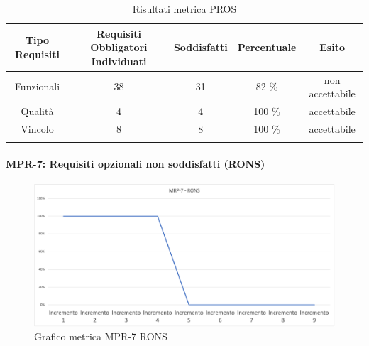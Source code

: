 \begin{center}
    \begin{longtable}{|c|c|c|c|c|}
        \hline
        \rowcolor{lighter-grayer}
        \textbf {Tipo Requisiti} & \textbf{Requisiti Obbligatori Individuati} & \textbf{Soddisfatti} & \textbf{Percentuale} & \textbf{Esito} \\
        \hline
        \endfirsthead

        \hline
        Funzionali & 38 & 31 & 82 \%  & non accettabile                \\
        Qualità & 4 & 4 & 100 \% & accettabile                         \\
        Vincolo & 8 & 8 & 100 \% & accettabile                          \\     
        \hline
        \rowcolor{white}
        \caption{Risultati metrica PROS}
    \end{longtable}
\end{center}


\newpage

\paragraph{MPR-7: Requisiti opzionali non soddisfatti (RONS)}\label{_SV}

\begin{center}
        \begin{figure}[!htb]
        \centering
        \includegraphics[scale=0.40]{res/images/ra/RA_RONS.png}
        \caption{Grafico metrica MPR-7 RONS}
    \end{figure}
    \begin{center}
    \end{center}
\end{center}

